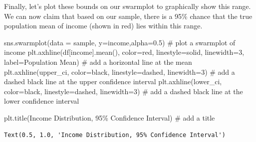 \documentclass[
  letterpaper,
  DIV=11,
  numbers=noendperiod]{scrreprt}
\newenvironment{Shaded}{\begin{snugshade}}{\end{snugshade}}
\newcommand{\CommentTok}[1]{\textcolor[rgb]{0.37,0.37,0.37}{#1}}
\newcommand{\DecValTok}[1]{\textcolor[rgb]{0.68,0.00,0.00}{#1}}
\newcommand{\FloatTok}[1]{\textcolor[rgb]{0.68,0.00,0.00}{#1}}
\newcommand{\NormalTok}[1]{\textcolor[rgb]{0.00,0.23,0.31}{#1}}
\newcommand{\OperatorTok}[1]{\textcolor[rgb]{0.37,0.37,0.37}{#1}}
\newcommand{\StringTok}[1]{\textcolor[rgb]{0.13,0.47,0.30}{#1}}
\begin{document}
Finally, let's plot these bounds on our swarmplot to graphically show
this range. We can now claim that based on our sample, there is a 95\%
chance that the true population mean of income (shown in red) lies
within this range.

\begin{Shaded}
\begin{Highlighting}[]
\NormalTok{sns.swarmplot(data }\OperatorTok{=}\NormalTok{ sample, y}\OperatorTok{=}\StringTok{\textquotesingle{}income\textquotesingle{}}\NormalTok{,alpha}\OperatorTok{=}\FloatTok{0.5}\NormalTok{) }\CommentTok{\# plot a swarmplot of income}
\NormalTok{plt.axhline(df[}\StringTok{\textquotesingle{}income\textquotesingle{}}\NormalTok{].mean(), color}\OperatorTok{=}\StringTok{\textquotesingle{}red\textquotesingle{}}\NormalTok{, linestyle}\OperatorTok{=}\StringTok{\textquotesingle{}solid\textquotesingle{}}\NormalTok{, linewidth}\OperatorTok{=}\DecValTok{3}\NormalTok{, label}\OperatorTok{=}\StringTok{\textquotesingle{}Population Mean\textquotesingle{}}\NormalTok{) }\CommentTok{\# add a horizontal line at the mean}
\NormalTok{plt.axhline(upper\_ci, color}\OperatorTok{=}\StringTok{\textquotesingle{}black\textquotesingle{}}\NormalTok{, linestyle}\OperatorTok{=}\StringTok{\textquotesingle{}dashed\textquotesingle{}}\NormalTok{, linewidth}\OperatorTok{=}\DecValTok{3}\NormalTok{) }\CommentTok{\# add a dashed black line at the upper confidence interval}
\NormalTok{plt.axhline(lower\_ci, color}\OperatorTok{=}\StringTok{\textquotesingle{}black\textquotesingle{}}\NormalTok{, linestyle}\OperatorTok{=}\StringTok{\textquotesingle{}dashed\textquotesingle{}}\NormalTok{, linewidth}\OperatorTok{=}\DecValTok{3}\NormalTok{) }\CommentTok{\# add a dashed black line at the lower confidence interval}

\NormalTok{plt.title(}\StringTok{\textquotesingle{}Income Distribution, 95\% Confidence Interval\textquotesingle{}}\NormalTok{) }\CommentTok{\# add a title}
\end{Highlighting}
\end{Shaded}

\begin{verbatim}
Text(0.5, 1.0, 'Income Distribution, 95% Confidence Interval')
\end{verbatim}
\end{document}
